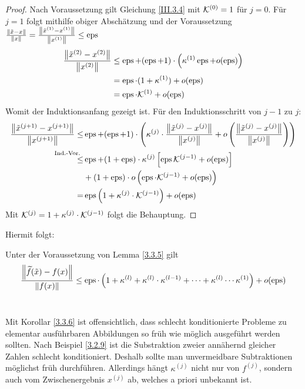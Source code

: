 \begin{Leme}[Fehlerfortpflanzung]
\begin{proof}
    Nach Voraussetzung gilt Gleichung \eqref{III.3.4}  mit $\K^{(0)}=1$ für $j=0$.
    Für $j=1$ folgt mithilfe obiger Abschätzung und der Voraussetzung 
    $\frac{\nn[\tilde{x}-x]}{\nn[x]} 
    = \frac{\nn[\tilde{x}^{(1)}-x^{(1)}]}{\nn[x^{(1)}]}\leq \Eps$ 
    \begin{align*}
      \frac{\nn[\tilde{x}^{(2)}-x^{(2)}]}{\nn[x^{(2)}]}
      & \leq \Eps +(\Eps+1) \cdot \left( \kappa^{(1)}\Eps+ o(\Eps)\right) \\
      &= \Eps\cdot(1+\kappa^{(1)}) + o(\Eps) \\
      &= \Eps\cdot\K^{(1)} + o(\Eps)
    \end{align*}
    Womit der Induktionsanfang gezeigt ist.
    Für den Induktionsschritt von $j-1$ zu $j$:
    \begin{align*}
      \frac{\nn[\tilde{x}^{(j+1)}-x^{(j+1)}]}{\nn[x^{(j+1)}]}
      \leq& \Eps + (\Eps+1) \cdot
            \left(
            \kappa^{(j)}\cdot \frac{\nn[\tilde{x}^{(j)}-x^{(j)}]}{\nn[x^{(j)}]}
            + o\left( 
            \frac{\nn[\tilde{x}^{(j)}-x^{(j)}]}{\nn[x^{(j)}]}
            \right)
            \right)\\
      \overset{\mathllap{\text{Ind.-Vor.}}}{\leq}
          & \Eps + (1+\Eps)
            \cdot\kappa^{(j)} \left[ \Eps \K^{(j-1)}+ o(\Eps) \right] \\
          &+ (1+\Eps) \cdot o\left( \Eps\cdot \K^{(j-1)} +o(\Eps)\right) \\
      =& \Eps\left(1+\kappa^{(j)}\cdot \K^{(j-1)}\right)+ o(\Eps)
    \end{align*}
    Mit $\K^{(j)} = 1+ \kappa^{(j)}\cdot \K^{(j-1)}$ folgt die Behauptung.
  \end{proof}
\end{Leme}

Hiermit folgt:

\begin{Kore}
  \label{3.3.6}
  Unter der Voraussetzung von Lemma \ref{3.3.5} gilt
  \begin{gather}
    \frac{\nn[\widetilde{f}(\tilde{x})-f(x)]}{\nn[f(x)]} \leq 
    \Eps\cdot \left( 1+\kappa^{(l)}+ \kappa^{(l)}\cdot \kappa^{(l-1)}+ \dotsb
      + \kappa^{(l)}\dotsm\kappa^{(1)}\right) + o(\Eps) 
    \label{III.3.5}
  \end{gather}~
\end{Kore}

\begin{Beme}
  Mit Korollar \ref{3.3.6} ist offensichtlich, 
  dass schlecht konditionierte Probleme 
  zu elementar ausführbaren Abbildungen
  so früh wie möglich ausgeführt werden sollten. 
  Nach Beispiel \ref{3.2.9} ist die Substraktion 
  zweier annähernd gleicher Zahlen schlecht konditioniert.
  Deshalb sollte man unvermeidbare Subtraktionen möglichst früh durchführen.
  Allerdings hängt $\kappa^{(j)}$ nicht nur von $f^{(j)}$, sondern auch vom 
  Zwischenergebnis $x^{(j)}$ ab, welches a priori unbekannt ist.
\end{Beme}

